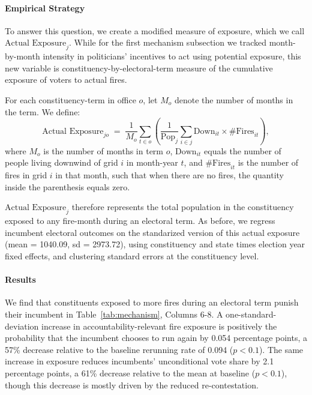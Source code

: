 \documentclass[12pt]{article}
\begin{document}
\paragraph{Empirical Strategy}
To answer this question, we create a modified measure of exposure, which we call $\text{Actual Exposure}_{j}$. While for the first mechanism subsection we tracked month-by-month intensity in politicians' incentives to act using potential exposure, this new variable is constituency-by-electoral-term measure of the cumulative exposure of voters to actual fires. %

For each constituency-term in office $o$, let $M_o$ denote the number of months in the term. We define:
\begin{equation}
\text{Actual Exposure}_{jo} \;=\; \frac{1}{M_o} \sum_{t \in o} 
\left( \frac{1}{\text{Pop}_j} \sum_{i \in j} \text{Down}_{it} \times \text{\#Fires}_{it} \right),
\label{eq:actexposure}
\end{equation}
where $M_o$ is the number of months in term $o$, $\text{Down}_{it}$ equals the number of people living downwind of grid $i$ in month-year $t$, and $\text{\#Fires}_{it}$ is the number of fires in grid $i$ in that month, such that when there are no fires, the quantity inside the parenthesis equals zero. 

$\text{Actual Exposure}_{j}$ therefore represents the total population in the constituency exposed to any fire-month during an electoral term. As before, we regress incumbent electoral outcomes on the standarized version of this actual exposure (mean = 1040.09, sd = 2973.72), using constituency and state times election year fixed effects, and clustering standard errors at the constituency level.

\paragraph{Results}
We find that constituents exposed to more fires during an electoral term punish their incumbent in Table~\ref{tab:mechanism}, Columns 6-8. A one-standard-deviation increase in accountability-relevant fire exposure is positively the probability that the incumbent chooses to run again by 0.054 percentage points, a 57\% decrease relative to the baseline rerunning rate of 0.094 ($p<0.1$). The same increase in exposure reduces incumbents' unconditional vote share by 2.1 percentage points, a 61\% decrease relative to the mean at baseline ($p<0.1$), though this decrease is mostly driven by the reduced re-contestation.
\end{document}
